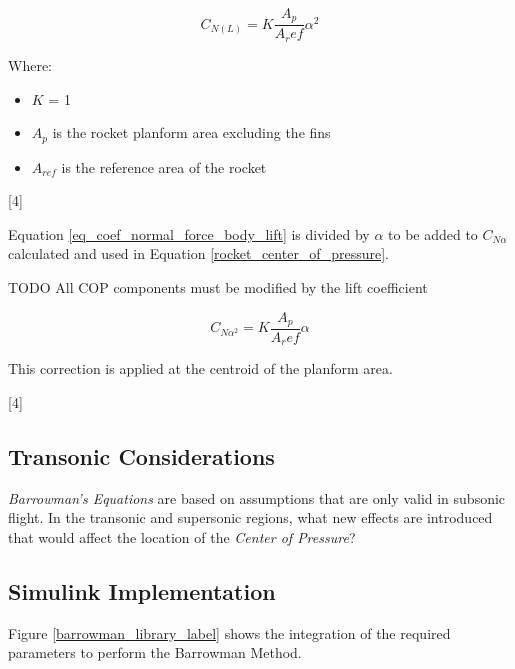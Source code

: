 \documentclass[]{article}
\providecommand{\tightlist}{%
  \setlength{\itemsep}{0pt}\setlength{\parskip}{0pt}}
\begin{document}
\begin{equation}
\label{eq_coef_normal_force_body_lift}
C_{N(L)} = K \dfrac{A_p}{A_ref} \alpha^2
\end{equation}

Where:

\begin{itemize}
\tightlist
\item
  \(K\) = 1
\item
  \(A_p\) is the rocket planform area excluding the fins
\item
  \(A_{ref}\) is the reference area of the rocket
\end{itemize}

{[}4{]}

Equation \ref{eq_coef_normal_force_body_lift} is divided by \(\alpha\)
to be added to \(C_{N \alpha}\) calculated and used in Equation
\ref{rocket_center_of_pressure}.

TODO All COP components must be modified by the lift coefficient

\begin{equation}
\label{eq_coef_normal_force_body_lift_alpha}
C_{N \alpha^2} = K \dfrac{A_p}{A_ref} \alpha
\end{equation}

This correction is applied at the centroid of the planform area.

{[}4{]}

\subsection{Transonic Considerations}\label{transonic-considerations}

\emph{Barrowman's Equations} are based on assumptions that are only
valid in subsonic flight. In the transonic and supersonic regions, what
new effects are introduced that would affect the location of the
\emph{Center of Pressure}?

\clearpage

\subsection{Simulink Implementation}\label{simulink-implementation}

Figure \ref{barrowman_library_label} shows the integration of the
required parameters to perform the Barrowman Method.
\end{document}
